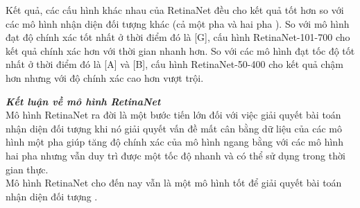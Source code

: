 {    Kết quả, các cấu hình khác nhau của RetinaNet  đều cho kết quả tốt hơn so với các mô hình nhận diện đối tượng  khác (cả một pha  và hai pha ).
    So với mô hình đạt độ chính xác tốt nhất ở thời điểm đó là [G], cấu hình RetinaNet-101-700 cho kết quả chính xác hơn với thời gian nhanh hơn.
    So với các mô hình đạt tốc độ tốt nhất ở thời điểm đó là [A] và [B], cấu hình RetinaNet-50-400 cho kết quả chậm hơn nhưng với độ chính xác cao hơn vượt trội.

    \noindent
    \textbf{\textit{Kết luận về mô hình RetinaNet}} \\
    Mô hình RetinaNet  ra đời là một bước tiến lớn đối với việc giải quyết bài toán nhận diện đối tượng  khi nó giải quyết vấn đề mất cân bằng dữ liệu  của các mô hình một pha  giúp tăng độ chính xác của mô hình ngang bằng với các mô hình hai pha  nhưng vẫn duy trì được một tốc độ nhanh và có thể sử dụng trong thời gian thực. \\
    Mô hình RetinaNet  cho đến nay vẫn là một mô hình tốt để giải quyết bài toán nhận diện đối tượng .
}
